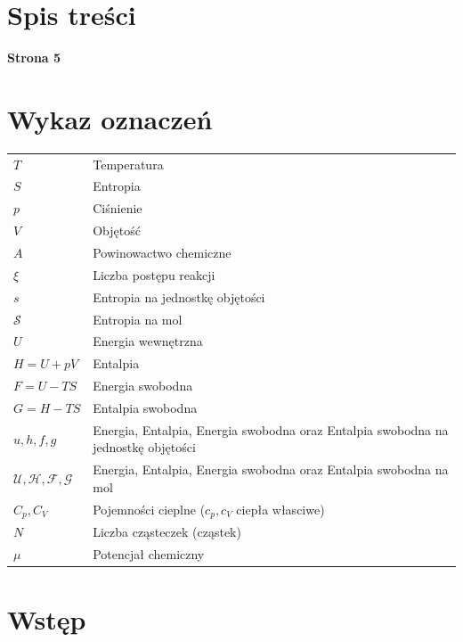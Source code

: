\documentclass[10pt, a4paper, twoside, onecolumn]{article}
\numberwithin{equation}{section}
\begin{document}
	\section*{Spis treści}
	\begin{center}
		\textbf{Strona 5}
	\end{center}
	\tableofcontents
	\pagebreak
	
	\section*{Wykaz oznaczeń}
	\setlength{\parindent}{0cm}
	\begin{table}[H]
	\begin{tabular}{@{} ll}
		\(T\) & Temperatura \\
		\(S\) & Entropia \\
		\(p\) & Ciśnienie \\
		\(V\) & Objętość \\
		\(A\) & Powinowactwo chemiczne \\
		\(\xi\) & Liczba postępu reakcji \\
		\(s\) & Entropia na jednostkę objętości \\
		\(\mathscr{S}\) & Entropia na mol \\
		\(U\) & Energia wewnętrzna \\
		\(H=U+pV\) & Entalpia \\
		\(F=U-TS\) & Energia swobodna \\
		\(G=H-TS\) & Entalpia swobodna \\
		\(u, h, f, g\) & Energia, Entalpia, Energia swobodna oraz Entalpia swobodna na jednostkę objętości \\
		\(\mathscr{U, H, F, G}\) & Energia, Entalpia, Energia swobodna oraz Entalpia swobodna na mol \\
		\(C_{p}, C_{V}\) & Pojemności cieplne (\(c_{p}, c_{V}\) ciepła własciwe) \\
		\(N\) & Liczba cząsteczek (cząstek) \\
		\(\mu\) & Potencjał chemiczny
	\end{tabular}
	\end{table}
	\setlength{\parindent}{1.25cm}
	\pagebreak
	
	\section{Wstęp}
	
\end{document}
